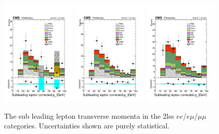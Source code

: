 \begin{figure}[htp]
\centering
\includegraphics[width=0.32\textwidth]{ch5_figs/l2_pt_ttH_ee_stackPlot_SR.pdf}
\includegraphics[width=0.32\textwidth]{ch5_figs/l2_pt_ttH_em_stackPlot_SR.pdf}
\includegraphics[width=0.32\textwidth]{ch5_figs/l2_pt_ttH_mm_stackPlot_SR.pdf} \\
\caption[Data/MC comparison of subleading lepton \pt in the signal region]{The sub leading lepton transverse momenta in the 2lss $ee$/$e\mu$/$\mu\mu$ categories. Uncertainties shown are purely statistical.}
\label{fig:sr_l2pt}
\end{figure}

